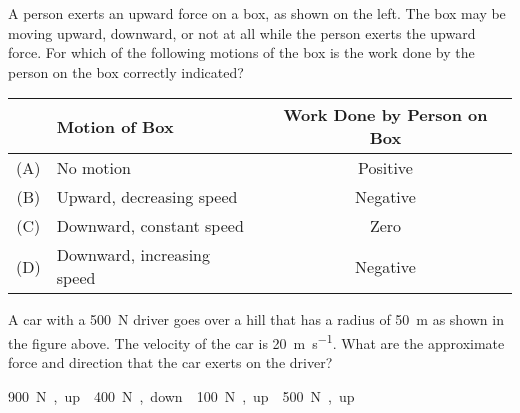 \documentclass[12pt]{exam}
\newcommand{\pic}[2]{
  \begin{center}
    \texttt{[image: \#2]}
  \end{center}
}
\begin{document}
\begin{questions}
  \question A person exerts an upward force on a box, as shown on the left. The
  box may be moving upward, downward, or not at all while the person exerts the
  upward force. For which of the following motions of the box is the work done
  by the person on the box correctly indicated?
  
  \begin{tabular}{clc}
    & Motion of Box & Work Done by Person on Box \\
    \hline
    (A) & No motion                  & Positive \\
    (B) & Upward, decreasing speed   & Negative \\
    (C) & Downward, constant speed   & Zero     \\
    (D) & Downward, increasing speed & Negative
  \end{tabular}
  

  \uplevel{
    \centering
    \pic{.4}{IMG_20200810_093039201}
  }
  \question A car with a \SI{500}{\newton} driver goes over a hill that has a
  radius of \SI{50}{\metre} as shown in the figure above. The velocity of the
  car is \SI{20}{\metre\per\second}. What are the approximate force and
  direction that the car exerts on the driver?
  \begin{choices}
    \choice\SI{900}\newton, up
    \choice\SI{400}\newton, down
    \choice\SI{100}\newton, up
    \choice\SI{500}\newton, up
  \end{choices}
  \newpage
  

\end{questions}
\end{document}
